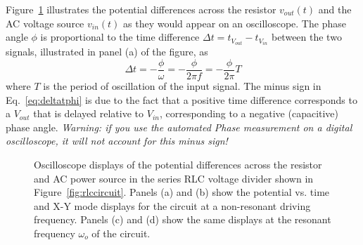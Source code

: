 \documentclass[11pt]{article}
\begin{document}
Figure~\ref{fig:rlcscope} illustrates the potential differences across
the resistor $v_{out}(t)$ and the AC voltage source $v_{in}(t)$ as
they would appear on an oscilloscope.  The phase angle $\phi$ is
proportional to the time difference $\Delta t = t_{V_{out}} -
t_{V_{in}}$ between the two signals, illustrated in panel (a) of the
figure, as
\begin{equation}
  \Delta t = -\frac{\phi}{\omega} = -\frac{\phi}{2 \pi f} =
  -\frac{\phi}{2 \pi} T
  \label{eq:deltatphi}
\end{equation}
where $T$ is the period of oscillation of the input signal. The minus
sign in Eq.~\ref{eq:deltatphi} is due to the fact that a positive time
difference corresponds to a $V_{out}$ that is delayed relative to
$V_{in}$, corresponding to a negative (capacitive) phase
angle. \textit{Warning: if you use the automated Phase measurement on
  a digital oscilloscope, it will not account for this minus sign!}

\begin{figure}[ht]
  \begin{center}
    \vspace{12 pt} 
    \caption{Oscilloscope displays of the potential differences across
      the resistor and AC power source in the series RLC voltage
      divider shown in Figure~\ref{fig:rlccircuit}. Panels (a) and (b)
      show the potential vs. time and X-Y mode displays for the
      circuit at a non-resonant driving frequency. Panels (c) and (d)
      show the same displays at the resonant frequency $\omega_o$ of
      the circuit.}
    \label{fig:rlcscope}
  \end{center}
\end{figure}
\end{document}
